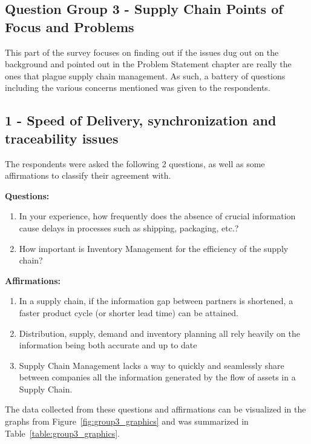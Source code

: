 \subsection{Question Group 3 - Supply Chain Points of Focus and Problems}
\label{sec-supplychainissues}
This part of the survey focuses on finding out if the issues dug out on the background and pointed out in the Problem Statement chapter are really the ones that plague supply chain management. As such, a battery of questions including the various concerns mentioned was given to the respondents.

\subsection*{1 - Speed of Delivery, synchronization and traceability issues}

The respondents were asked the following 2 questions, as well as some affirmations to classify their agreement with.

\par\textbf{Questions:}
\begin{enumerate}
  \item In your experience, how frequently does the absence of crucial information cause delays in processes such as shipping, packaging, etc.?
  \item How important is Inventory Management for the efficiency of the supply chain?
\end{enumerate}

\par\textbf{Affirmations:}
\begin{enumerate}

\item In a supply chain, if the information gap between partners is shortened, a faster product cycle (or shorter lead time) can be attained.
\item Distribution, supply, demand and inventory planning all rely heavily on the information being both accurate and up to date

\item Supply Chain Management lacks a way to quickly and seamlessly share between companies all the information generated by the flow of assets in a Supply Chain.
\end{enumerate}

The data collected from these questions and affirmations can be visualized in the graphs from Figure~\ref{fig:group3_graphics} and was summarized in Table~\ref{table:group3_graphics}.

